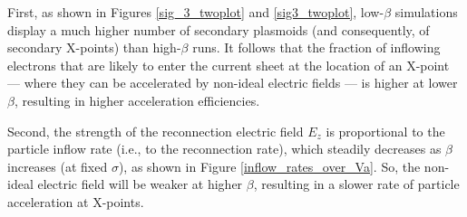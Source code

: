 First, as shown in Figures \ref{sig_3_twoplot} and \ref{sig3_twoplot}, low-$\beta$ simulations display a much higher number of secondary plasmoids (and consequently, of secondary X-points) than high-$\beta$ runs. It follows that the fraction of inflowing electrons that are likely to enter the current sheet at the location of an X-point --- where they can be accelerated by non-ideal electric fields --- is higher at lower $\beta$, resulting in higher acceleration efficiencies.

Second, the strength of the reconnection electric field $E_z$ is proportional to the particle inflow rate (i.e., to the reconnection rate), which steadily decreases as $\beta$ increases (at fixed $\sigma$), as shown in Figure \ref{inflow_rates_over_Va}. So, the non-ideal electric field will be weaker at higher $\beta$, resulting in a slower rate of particle acceleration at X-points.

